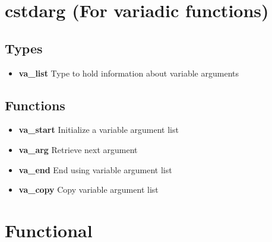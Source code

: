 \documentclass{report}
\begin{document}
    \pagebreak \bigbreak \noindent 
    \section{\LARGE cstdarg (For variadic functions)}
    \bigbreak \noindent 
    \subsection{Types}
    \begin{itemize}
        \item \textbf{va\_list} Type to hold information about variable arguments 
    \end{itemize}
    \bigbreak \noindent 
    \subsection{Functions}
    \begin{itemize}
        \item \textbf{va\_start}	Initialize a variable argument list 
        \item \textbf{va\_arg} Retrieve next argument 
        \item \textbf{va\_end} End using variable argument list 
        \item \textbf{va\_copy} Copy variable argument list 
    \end{itemize}

    \pagebreak \bigbreak \noindent 
    \section{\LARGE Functional}
    \bigbreak \noindent 
\end{document}
